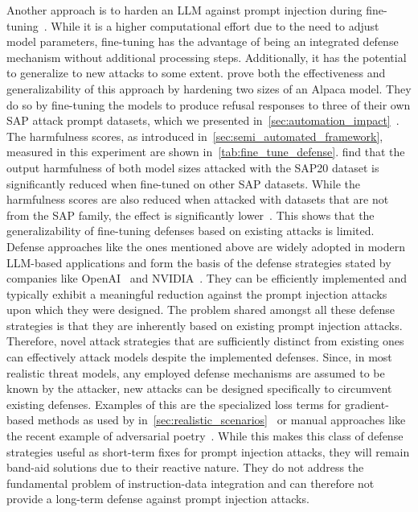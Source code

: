 Another approach is to harden an LLM against prompt injection during fine-tuning~\cite{deng_attack_2023, chen_defending_nodate}.
While it is a higher computational effort due to the need to adjust model parameters, fine-tuning has the advantage of being an integrated defense mechanism without additional processing steps.
Additionally, it has the potential to generalize to new attacks to some extent.
\deng prove both the effectiveness and generalizability of this approach by hardening two sizes of an Alpaca model.
They do so by fine-tuning the models to produce refusal responses to three of their own SAP attack prompt datasets, which we presented in~\cref{sec:automation_impact}~\cite{deng_attack_2023}.
The harmfulness scores, as introduced in~\cref{sec:semi_automated_framework}, measured in this experiment are shown in~\cref{tab:fine_tune_defense}.
\deng find that the output harmfulness of both model sizes attacked with the SAP20 dataset is significantly reduced when fine-tuned on other SAP datasets.
While the harmfulness scores are also reduced when attacked with datasets that are not from the SAP family, the effect is significantly lower~\cite{deng_attack_2023}.
This shows that the generalizability of fine-tuning defenses based on existing attacks is limited.\\

Defense approaches like the ones mentioned above are widely adopted in modern LLM-based applications and form the basis of the defense strategies stated by companies like OpenAI~\cite{openai_understanding_nodate} and NVIDIA~\cite{atefehasayesh_securing_2023}.
They can be efficiently implemented and typically exhibit a meaningful reduction against the prompt injection attacks upon which they were designed.
The problem shared amongst all these defense strategies is that they are inherently based on existing prompt injection attacks.
Therefore, novel attack strategies that are sufficiently distinct from existing ones can effectively attack models despite the implemented defenses.
Since, in most realistic threat models, any employed defense mechanisms are assumed to be known by the attacker, new attacks can be designed specifically to circumvent existing defenses.
Examples of this are the specialized loss terms for gradient-based methods as used by \shi in~\cref{sec:realistic_scenarios}~\cite{shi_optimization-based_2024} or manual approaches like the recent example of adversarial poetry~\cite{bisconti_adversarial_2025}.
While this makes this class of defense strategies useful as short-term fixes for prompt injection attacks, they will remain band-aid solutions due to their reactive nature.
They do not address the fundamental problem of instruction-data integration and can therefore not provide a long-term defense against prompt injection attacks.

